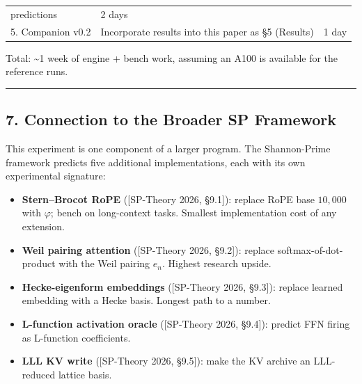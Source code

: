 \documentclass[
  11pt,
]{article}
\providecommand{\tightlist}{%
  \setlength{\itemsep}{0pt}\setlength{\parskip}{0pt}}
\begin{document}
\begin{longtable}[]{@{}lll@{}}
\begin{minipage}[t]{0.30\columnwidth}
predictions\strut
\end{minipage} & \begin{minipage}[t]{0.30\columnwidth}\raggedright
2 days\strut
\end{minipage}\tabularnewline
\begin{minipage}[t]{0.30\columnwidth}\raggedright
5. Companion v0.2\strut
\end{minipage} & \begin{minipage}[t]{0.30\columnwidth}\raggedright
Incorporate results into this paper as §5 (Results)\strut
\end{minipage} & \begin{minipage}[t]{0.30\columnwidth}\raggedright
1 day\strut
\end{minipage}\tabularnewline
\bottomrule
\end{longtable}

Total: \textasciitilde1 week of engine + bench work, assuming an A100 is
available for the reference runs.

\begin{center}\rule{0.5\linewidth}{0.5pt}\end{center}

\hypertarget{connection-to-the-broader-sp-framework}{%
\subsection{7. Connection to the Broader SP
Framework}\label{connection-to-the-broader-sp-framework}}

This experiment is one component of a larger program. The Shannon-Prime
framework predicts five additional implementations, each with its own
experimental signature:

\begin{itemize}
\tightlist
\item
  \textbf{Stern--Brocot RoPE} ({[}SP-Theory 2026, §9.1{]}): replace RoPE
  base \(10{,}000\) with \(\varphi\); bench on long-context tasks.
  Smallest implementation cost of any extension.
\item
  \textbf{Weil pairing attention} ({[}SP-Theory 2026, §9.2{]}): replace
  softmax-of-dot-product with the Weil pairing \(e_n\). Highest research
  upside.
\item
  \textbf{Hecke-eigenform embeddings} ({[}SP-Theory 2026, §9.3{]}):
  replace learned embedding with a Hecke basis. Longest path to a
  number.
\item
  \textbf{L-function activation oracle} ({[}SP-Theory 2026, §9.4{]}):
  predict FFN firing as L-function coefficients.
\item
  \textbf{LLL KV write} ({[}SP-Theory 2026, §9.5{]}): make the KV
  archive an LLL-reduced lattice basis.
\end{itemize}
\end{document}
